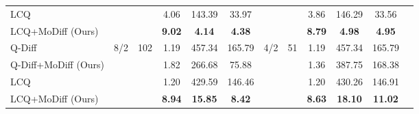 \begin{table}[!ht]
{\begin{tabular}{l|c|c|ccc||c|c|cccc}
LCQ & && 4.06 & 143.39 & 33.97 && & 3.86 & 146.29 & 33.56 \\
LCQ+MoDiff (Ours) & & & \bf 9.02 & \bf 4.14 & \bf 4.38 & && \bf 8.79 & \bf 4.98 & \bf 4.95 & \\
\midrule
Q-Diff & \multirow{4}{*}{8/2}& \multirow{4}{*}{102} & 1.19 & 457.34 & 165.79 & \multirow{4}{*}{4/2}& \multirow{4}{*}{51} & 1.19 & 457.34 & 165.79 & \\
Q-Diff+MoDiff (Ours) & & & 1.82 & 266.68 & 75.88 && & 1.36 & 387.75 & 168.38 & \\
LCQ && & 1.20 & 429.59 & 146.46 && & 1.20 & 430.26 & 146.91 \\
LCQ+MoDiff (Ours) & & & \bf 8.94 & \bf 15.85 & \bf 8.42 & && \bf 8.63 & \bf 18.10 & \bf 11.02 & \\
\bottomrule
\end{tabular}
}
\label{tab:cifar10}
\end{table}


